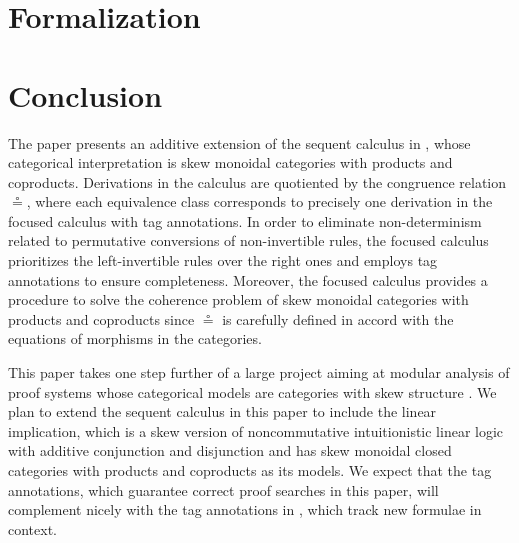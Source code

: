 \documentclass[submission,copyright,creativecommons]{eptcs}
\theoremstyle{definition}
\newcommand{\proofbox}[1]{\begin{tabular}{l} #1 \end{tabular}}
\begin{document}


\section{Formalization}\label{sec:formalization}


\section{Conclusion}
The paper presents an additive extension of the sequent calculus in \cite{uustalu:sequent:2021}, whose categorical interpretation is skew monoidal categories with products and coproducts.
Derivations in the calculus are quotiented by the congruence relation $\circeq$, where each equivalence class corresponds to precisely one derivation in the focused calculus with tag annotations.
In order to eliminate non-determinism related to permutative conversions of non-invertible rules, the focused calculus prioritizes the left-invertible rules over the right ones and employs tag annotations to ensure completeness.
Moreover, the focused calculus provides a procedure to solve the coherence problem of skew monoidal categories with products and coproducts since $\circeq$ is carefully defined in accord with the equations of morphisms in the categories.
 
This paper takes one step further of a large project aiming at modular analysis of proof systems whose categorical models are categories with skew structure \cite{zeilberger:semiassociative:19, uustalu:sequent:2021,uustalu:proof:nodate,uustalu:deductive:nodate,veltri:coherence:2021,UVW:protsn}.
We plan to extend the sequent calculus in this paper to include the linear implication, which is a skew version of noncommutative intuitionistic linear logic with additive conjunction and disjunction and has skew monoidal closed categories with products and coproducts as its models.
We expect that the tag annotations, which guarantee correct proof searches in this paper, will complement nicely with the tag annotations in \cite{UVW:protsn}, which track new formulae in context.
\end{document}
